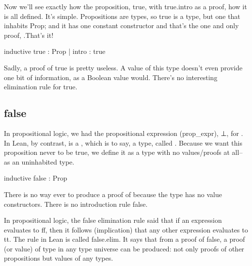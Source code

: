 \documentclass[letterpaper,10pt,english]{sphinxmanual}
\begin{document}
\sphinxAtStartPar
Now we’ll see exactly how the proposition, true, with
true.intro as a proof, how it is all defined. It’s simple.
Propositions are types, so true is a type, but one that
inhabits Prop; and it has one constant constructor and
that’s the one and only proof, .That’s it!

\sphinxAtStartPar
inductive true : Prop
| intro : true

\sphinxAtStartPar
Sadly, a proof of true is pretty useless. A value of this type
doesn’t even provide one bit of information, as a Boolean value
would. There’s no interesting elimination rule for true.


\subsection{false}
\label{\detokenize{A_02_Constructive_Logic:false}}
\sphinxAtStartPar
In propositional logic, we had the propositional expression
(prop\_expr), ⊥, for . In Lean, by contrast,  is
a , which is to say, a type, called .
Because we want this proposition never to be true, we define
it as a type with no values/proofs at all–as an uninhabited
type.

\sphinxAtStartPar
inductive false : Prop

\sphinxAtStartPar
There is no way ever to produce a proof of  because
the type has no value constructors. There is no introduction
rule false.

\sphinxAtStartPar
In propositional logic, the false elimination rule said that
if an expression evaluates to ff, then it follows (implication)
that any other expression evaluates to tt. The rule in Lean is
called false.elim. It says that from a proof of false, a proof
(or value) of  type in any type universe can be produced:
not only proofs of other propositions but values of any types.
\end{document}
